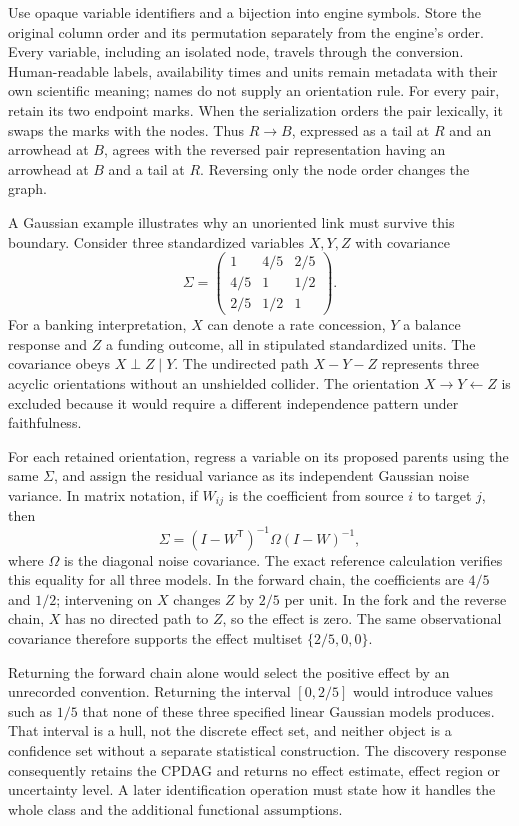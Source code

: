 Use opaque variable identifiers and a bijection into engine symbols.
Store the original column order and its permutation separately from the
engine's order. Every variable, including an isolated node, travels
through the conversion. Human-readable labels, availability times and
units remain metadata with their own scientific meaning; names do not
supply an orientation rule. For every pair, retain its two endpoint
marks. When the serialization orders the pair lexically, it swaps the
marks with the nodes. Thus \(R\to B\), expressed as a tail at \(R\) and
an arrowhead at \(B\), agrees with the reversed pair representation
having an arrowhead at \(B\) and a tail at \(R\). Reversing only the
node order changes the graph.
\citep{exec13_java_tetrad,exec13_java_adapter_oracles}

A Gaussian example illustrates why an unoriented link must survive this
boundary. Consider three standardized variables \(X,Y,Z\) with
covariance \[
 \Sigma=\begin{pmatrix}
 1&4/5&2/5\\
 4/5&1&1/2\\
 2/5&1/2&1
 \end{pmatrix}.
\] For a banking interpretation, \(X\) can denote a rate concession,
\(Y\) a balance response and \(Z\) a funding outcome, all in stipulated
standardized units. The covariance obeys \(X\perp Z\mid Y\). The
undirected path \(X-Y-Z\) represents three acyclic orientations without
an unshielded collider. The orientation \(X\to Y\leftarrow Z\) is
excluded because it would require a different independence pattern under
faithfulness. \citep{exec13_java_adapter_oracles}

For each retained orientation, regress a variable on its proposed
parents using the same \(\Sigma\), and assign the residual variance as
its independent Gaussian noise variance. In matrix notation, if
\(W_{ij}\) is the coefficient from source \(i\) to target \(j\), then \[
 \Sigma=(I-W^{\mathsf T})^{-1}\Omega(I-W)^{-1},
\] where \(\Omega\) is the diagonal noise covariance. The exact
reference calculation verifies this equality for all three models. In
the forward chain, the coefficients are \(4/5\) and \(1/2\); intervening
on \(X\) changes \(Z\) by \(2/5\) per unit. In the fork and the reverse
chain, \(X\) has no directed path to \(Z\), so the effect is zero. The
same observational covariance therefore supports the effect multiset
\(\{2/5,0,0\}\). \citep{exec13_java_adapter_oracles}

Returning the forward chain alone would select the positive effect by an
unrecorded convention. Returning the interval \([0,2/5]\) would
introduce values such as \(1/5\) that none of these three specified
linear Gaussian models produces. That interval is a hull, not the
discrete effect set, and neither object is a confidence set without a
separate statistical construction. The discovery response consequently
retains the CPDAG and returns no effect estimate, effect region or
uncertainty level. A later identification operation must state how it
handles the whole class and the additional functional assumptions.
\citep{exec13_java_adapter_contract,exec13_java_adapter_oracles}

